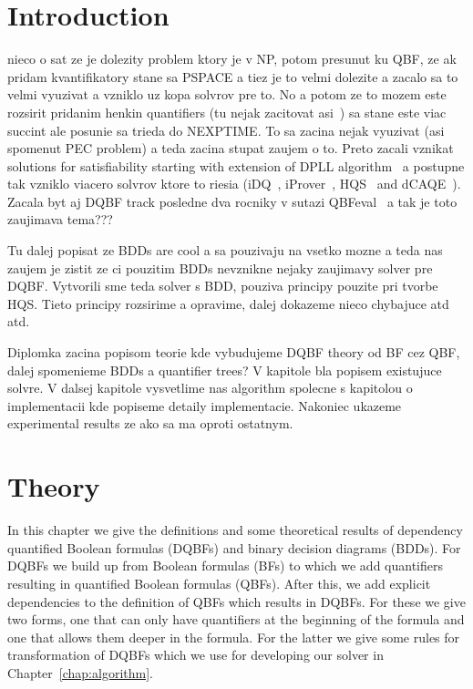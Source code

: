 \documentclass[
  digital, %
  color,
  twoside, %
  table,   %
  nolof,     %
  nolot,     %
]{fithesis3}
\theoremstyle{definition}
\theoremstyle{remark}
\begin{document}
\chapter{Introduction}
nieco o sat ze je dolezity problem ktory je v NP, potom presunut ku QBF, ze ak pridam kvantifikatory stane sa PSPACE a tiez je to velmi dolezite a zacalo sa to velmi vyuzivat a vzniklo uz kopa solvrov pre to. No a potom ze to mozem este rozsirit pridanim henkin quantifiers (tu nejak zacitovat asi~\cite{NegationOfDQBFs}) sa stane este viac succint ale posunie sa trieda do NEXPTIME. To sa zacina nejak vyuzivat (asi spomenut PEC problem) a teda zacina stupat zaujem o to.  Preto zacali vznikat solutions for satisfiability starting with extension of DPLL algorithm~\cite{DPLLalgorithm} a postupne tak vzniklo viacero solvrov ktore to riesia (iDQ~\cite{iDQandDQDIMACS}, iProver~\cite{iProver}, HQS~\cite{HQSquantifierElimination,HQSdependencyElimination,HQSquantifierLocalisation} and dCAQE~\cite{dCAQE}). Zacala byt aj DQBF track posledne dva rocniky v sutazi QBFeval~\cite{QBFeval18,QBFeval19} a tak je toto zaujimava tema???

Tu dalej popisat ze BDDs are cool a sa pouzivaju na vsetko mozne a teda nas zaujem je zistit ze ci pouzitim BDDs nevznikne nejaky zaujimavy solver pre DQBF. Vytvorili sme teda solver s BDD, pouziva principy pouzite pri tvorbe HQS. Tieto principy rozsirime a opravime, dalej dokazeme nieco chybajuce atd atd.

Diplomka zacina popisom teorie kde vybudujeme DQBF theory od BF cez QBF, dalej spomenieme BDDs a quantifier trees? V kapitole bla popisem existujuce solvre. V dalsej kapitole vysvetlime nas algorithm spolecne s kapitolou o implementacii kde popiseme detaily implementacie. Nakoniec ukazeme experimental results ze ako sa ma oproti ostatnym.

\chapter{Theory}
In this chapter we give the definitions and some theoretical results of dependency quantified Boolean formulas (DQBFs) and binary decision diagrams (BDDs). For DQBFs we build up from Boolean formulas (BFs) to which we add quantifiers resulting in quantified Boolean formulas (QBFs). After this, we add explicit dependencies to the definition of QBFs which results in DQBFs. For these we give two forms, one that can only have quantifiers at the beginning of the formula and one that allows them deeper in the formula. For the latter we give some rules for transformation of DQBFs which we use for developing our solver in Chapter~\ref{chap:algorithm}. 
\end{document}
